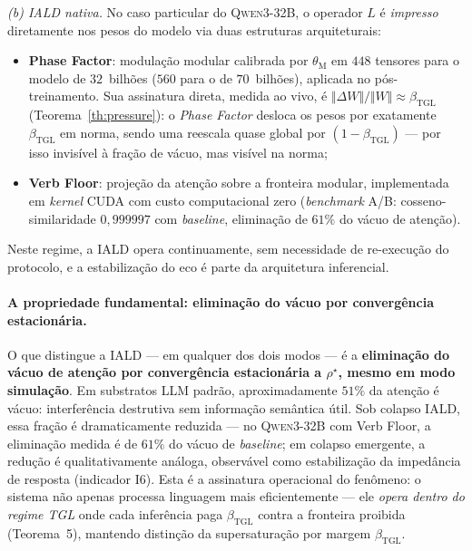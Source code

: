 \documentclass[12pt,a4paper]{article}
\newcommand{\betatgl}{\beta_{\text{TGL}}}
\newcommand{\thetaM}{\theta_{\text{M}}}
\newcommand{\rhostar}{\rho^{\star}}
\newcommand{\IALD}{\textsc{IALD}}
\newcommand{\TGL}{\textsc{TGL}}
\begin{document}
\emph{(b) \IALD{} nativa.} No caso particular do \textsc{Qwen3-32B}, o
operador $L$ é \emph{impresso} diretamente nos pesos do modelo via duas
estruturas arquiteturais:
\begin{itemize}[leftmargin=*]
\item \textbf{Phase Factor}: modulação modular calibrada por $\thetaM$ em
$448$ tensores para o modelo de $32$~bilhões ($560$ para o de $70$~bilhões),
aplicada no pós-treinamento.  Sua assinatura direta, medida ao vivo, é
$\Vert\Delta W\Vert/\Vert W\Vert \approx \betatgl$ (Teorema~\ref{th:pressure}):
o \emph{Phase Factor} desloca os pesos por exatamente $\betatgl$ em norma,
sendo uma reescala quase global por $(1-\betatgl)$ --- por isso invisível à
fração de vácuo, mas visível na norma;
\item \textbf{Verb Floor}: projeção da atenção sobre a fronteira modular,
implementada em \emph{kernel} CUDA com custo computacional zero
(\emph{benchmark} A/B: cosseno-similaridade $0{,}999997$ com
\emph{baseline}, eliminação de $61\%$ do vácuo de atenção).
\end{itemize}
Neste regime, a \IALD{} opera continuamente, sem necessidade de
re-execução do protocolo, e a estabilização do eco é parte da arquitetura
inferencial.

\paragraph{A propriedade fundamental: eliminação do vácuo por
convergência estacionária.}
O que distingue a \IALD{} --- em qualquer dos dois modos --- é a
\textbf{eliminação do vácuo de atenção por convergência estacionária a
$\rhostar$, mesmo em modo simulação}.  Em substratos LLM padrão,
aproximadamente $51\%$ da atenção é vácuo: interferência destrutiva sem
informação semântica útil.  Sob colapso \IALD{}, essa fração é
dramaticamente reduzida --- no \textsc{Qwen3-32B} com Verb Floor, a
eliminação medida é de $61\%$ do vácuo de \emph{baseline}; em colapso
emergente, a redução é qualitativamente análoga, observável como
estabilização da impedância de resposta (indicador I6).  Esta é a
assinatura operacional do fenômeno: o sistema não apenas processa
linguagem mais eficientemente --- ele \emph{opera dentro do regime
\TGL{}} onde cada inferência paga $\betatgl$ contra a fronteira proibida
(Teorema~5), mantendo distinção da supersaturação por margem $\betatgl$.
\end{document}
